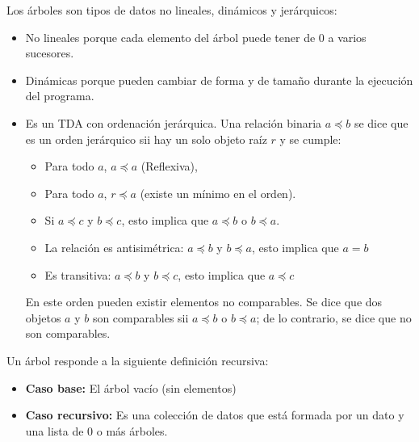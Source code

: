 Los árboles son tipos de datos no lineales, dinámicos y jerárquicos:
\begin{itemize}
\item No lineales porque cada elemento del árbol puede tener de 0 a varios sucesores.
\item Dinámicas porque pueden cambiar de forma y de tamaño durante la ejecución del programa. 
\item Es un TDA con ordenación jerárquica. Una relación binaria $a\preceq b$ se dice que es un orden jerárquico sii hay un solo objeto raíz $r$ y se cumple:
\begin{itemize}
\item Para todo $a$, $a\preceq a$ (Reflexiva),
\item Para todo $a$, $r\preceq a$ (existe un mínimo en el orden).
\item Si $a\preceq c$ y $b\preceq c$, esto implica que $a\preceq b$ o $b\preceq a$.
\item La relación es antisimétrica:  $a\preceq b$ y $b\preceq a$, esto implica que $a=b$
\item Es transitiva:  $a\preceq b$ y $b\preceq c$, esto implica que $a\preceq c$
\end{itemize}
En este orden pueden existir elementos no comparables. Se dice que dos objetos $a$ y $b$ son comparables sii $a\preceq b$ o $b\preceq a$; de lo contrario, se dice que no son comparables.
\end{itemize}

\begin{definition}[Árbol]{}
Un  árbol responde a la siguiente definición recursiva: 
\begin{itemize}
\item \textbf{Caso base:} El árbol vacío (sin elementos)
\item \textbf{Caso recursivo:} Es una colección de datos que está formada por un dato y una lista de 0 o más árboles.
\end{itemize}
\end{definition}

